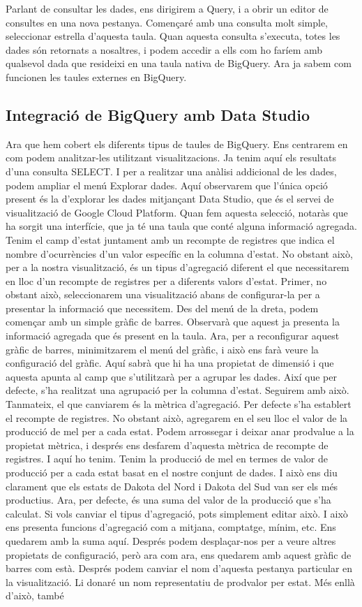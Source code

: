 \documentclass[12pt,longbibliography]{article}
\theoremstyle{definition}
\theoremstyle{remark}
\begin{document}
Parlant de consultar les dades, ens dirigirem a Query, i a obrir un editor de consultes en una nova pestanya. Començaré amb una consulta molt simple, seleccionar estrella d'aquesta taula. Quan aquesta consulta s'executa, totes les dades són retornats a nosaltres, i podem accedir a ells com ho faríem amb qualsevol dada que resideixi en una taula nativa de BigQuery. Ara ja sabem com funcionen les taules externes en BigQuery.

\subsection{Integració de BigQuery amb Data Studio}

Ara que hem cobert els diferents tipus de taules de BigQuery. Ens centrarem en com podem analitzar-les utilitzant visualitzacions. Ja tenim aquí els resultats d'una consulta SELECT. I per a realitzar una anàlisi addicional de les dades, podem ampliar el menú Explorar dades. Aquí observarem que l'única opció present és la d'explorar les dades mitjançant Data Studio, que és el servei de visualització de Google Cloud Platform. Quan fem aquesta selecció, notaràs que ha sorgit una interfície, que ja té una taula que conté alguna informació agregada. Tenim el camp d'estat juntament amb un recompte de registres que indica el nombre d'ocurrències d'un valor específic en la columna d'estat. No obstant això, per a la nostra visualització, és un tipus d'agregació diferent el que necessitarem en lloc d'un recompte de registres per a diferents valors d'estat. Primer, no obstant això, seleccionarem una visualització abans de configurar-la per a presentar la informació que necessitem. Des del menú de la dreta, podem començar amb un simple gràfic de barres. Observarà que aquest ja presenta la informació agregada que és present en la taula. Ara, per a reconfigurar aquest gràfic de barres, minimitzarem el menú del gràfic, i això ens farà veure la configuració del gràfic. Aquí sabrà que hi ha una propietat de dimensió i que aquesta apunta al camp que s'utilitzarà per a agrupar les dades. Així que per defecte, s'ha realitzat una agrupació per la columna d'estat. Seguirem amb això. Tanmateix, el que canviarem és la mètrica d'agregació. Per defecte s'ha establert el recompte de registres. No obstant això, agregarem en el seu lloc el valor de la producció de mel per a cada estat. Podem arrossegar i deixar anar prodvalue a la propietat mètrica, i després ens desfarem d'aquesta mètrica de recompte de registres. I aquí ho tenim. Tenim la producció de mel en termes de valor de producció per a cada estat basat en el nostre conjunt de dades. I això ens diu clarament que els estats de Dakota del Nord i Dakota del Sud van ser els més productius. Ara, per defecte, és una suma del valor de la producció que s'ha calculat. Si vols canviar el tipus d'agregació, pots simplement editar això. I això ens presenta funcions d'agregació com a mitjana, comptatge, mínim, etc. Ens quedarem amb la suma aquí. Després podem desplaçar-nos per a veure altres propietats de configuració, però ara com ara, ens quedarem amb aquest gràfic de barres com està. Després podem canviar el nom d'aquesta pestanya particular en la visualització. Li donaré un nom representatiu de prodvalor per estat. Més enllà d'això, també 
\end{document}
